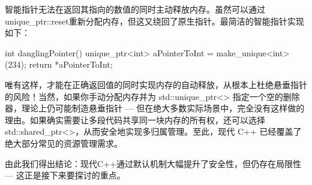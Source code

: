 智能指针无法在返回其指向的数值的同时主动释放内存。虽然可以通过unique\_ptr::reset重新分配内存，但这又绕回了原生指针。最简洁的智能指针实现如下：

\begin{cpp}
int danglingPointer() {
  unique_ptr<int> aPointerToInt = make_unique<int>(234);
  return *aPointerToInt;
}
\end{cpp}

唯有这样，才能在正确返回值的同时实现内存的自动释放，从根本上杜绝悬垂指针的风险！当然，如果你手动分配内存并为 std::unique\_ptr<> 指定一个空的删除器，理论上仍可能制造悬垂指针 --- 但在绝大多数实际场景中，完全没有这样做的理由。如果确实需要让多段代码共享同一块内存的所有权，还可以选择 std::shared\_ptr<>，从而安全地实现多归属管理。至此，现代 C++ 已经覆盖了绝大部分常见的资源管理需求。

由此我们得出结论：现代C++通过默认机制大幅提升了安全性，但仍存在局限性 --- 这正是接下来要探讨的重点。